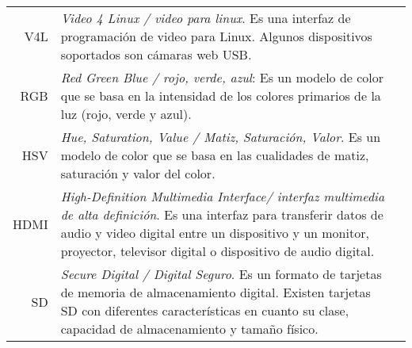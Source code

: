 \begin{tabular}{r p{16cm}l }
   V4L & \emph{Video 4 Linux / video para linux}. Es una interfaz de programación de video para Linux. Algunos dispositivos soportados son cámaras web USB. \\
   
   RGB & \emph{Red Green Blue / rojo, verde, azul}: Es un modelo de color que se basa en la intensidad de los colores primarios de la luz (rojo, verde y azul).\\
   
   HSV & \emph{Hue, Saturation, Value / Matiz, Saturación, Valor}. Es un modelo de color que se basa en las cualidades de matiz, saturación y valor del color. \\
   
	HDMI & \emph{High-Definition Multimedia Interface/ interfaz multimedia de alta definición}. Es una interfaz para transferir datos de audio y video digital entre un dispositivo y un monitor, proyector, televisor digital o dispositivo de audio digital. \\
	
	SD & \emph{Secure Digital / Digital Seguro}. Es un formato de tarjetas de memoria de almacenamiento digital. Existen tarjetas SD con diferentes características en cuanto su clase, capacidad de almacenamiento y tamaño físico.
	
\end{tabular}

 
 


  
 

  

 
